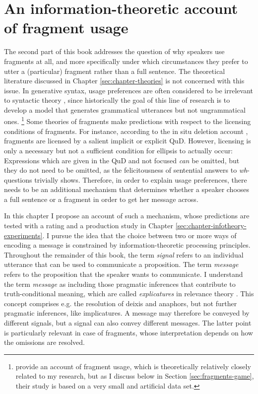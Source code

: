 \chapter{An information-theoretic account of fragment usage}
\label{sec:chapter-infotheory}

The second part of this book addresses the question of why speakers use fragments at all, and more specifically under which circumstances they prefer to utter a (particular) fragment rather than a full sentence. The theoretical literature discussed in Chapter \ref{sec:chapter-theories} is not concerned with this issue. In generative syntax, usage preferences are often considered to be irrelevant to syntactic theory \citep[see e.g.][]{newmeyer2003}, since historically the goal of this line of research is to develop a model that generates grammatical utterances but not ungrammatical ones.%
%
\footnote{\citet{bergen.goodman2015} provide an account of fragment usage, which is theoretically relatively closely related to my research, but as I discuss below in Section \ref{sec:fragments-game}, their study is based on a very small and artificial data set.}\afterfn%
%
Some theories of fragments make predictions with respect to the licensing conditions of fragments. For instance, according to the in situ deletion account \citep{reich2007}, fragments are licensed by a salient implicit or explicit QuD. However, licensing is only a necessary but not a sufficient condition for ellipsis to actually occur: Expressions which are given in the QuD and not focused \textit{can} be omitted, but they do not need to be omitted, as the felicitousness of sentential answers to \textit{wh}-questions trivially shows. Therefore, in order to explain usage preferences, there needs to be an additional mechanism that determines whether a speaker chooses a full sentence or a fragment in order to get her message across. 

In this chapter I propose an account of such a mechanism, whose predictions are tested with a rating and a production study in Chapter \ref{sec:chapter-infotheory-experiments}. I pursue the idea that the choice between two or more ways of encoding a message is constrained by information-theoretic \citep{shannon1948} processing principles. Throughout the remainder of this book, the term \textit{signal} refers to an individual utterance that can be used to communicate a proposition. The term \textit{message} refers to the proposition that the speaker wants to communicate. I understand the term \textit{message} as including those pragmatic inferences that contribute to truth-conditional meaning, which are called \textit{explicatures} in relevance theory \citep{sperber.wilson1995}. This concept comprises e.g. the resolution of deixis and anaphors, but not further pragmatic inferences, like implicatures. A message may therefore be conveyed by different signals, but a signal can also convey different messages. The latter point is particularly relevant in case of fragments, whose interpretation depends on how the omissions are resolved.

